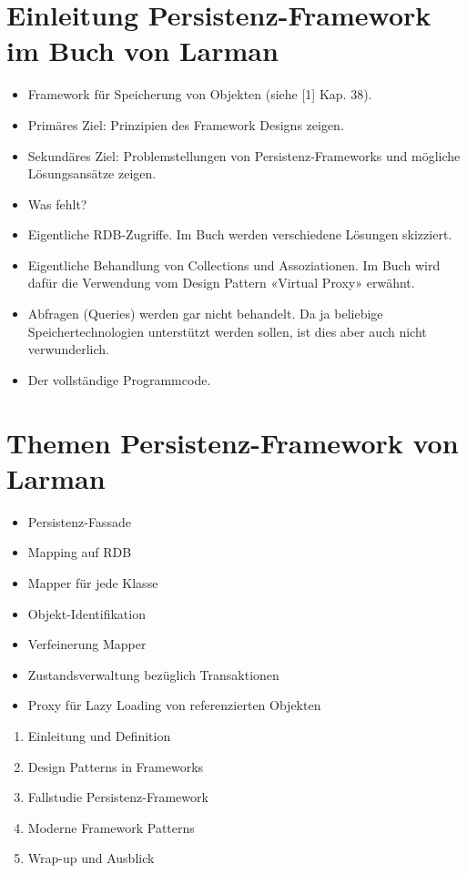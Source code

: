 \section*{Einleitung Persistenz-Framework im Buch von Larman}
\begin{itemize}
  \item Framework für Speicherung von Objekten (siehe [1] Kap. 38).
  \item Primäres Ziel: Prinzipien des Framework Designs zeigen.
  \item Sekundäres Ziel: Problemstellungen von Persistenz-Frameworks und mögliche Lösungsansätze zeigen.
  \item Was fehlt?
  \item Eigentliche RDB-Zugriffe. Im Buch werden verschiedene Lösungen skizziert.
  \item Eigentliche Behandlung von Collections und Assoziationen. Im Buch wird dafür die Verwendung vom Design Pattern «Virtual Proxy» erwähnt.
  \item Abfragen (Queries) werden gar nicht behandelt. Da ja beliebige Speichertechnologien unterstützt werden sollen, ist dies aber auch nicht verwunderlich.
  \item Der vollständige Programmcode.
\end{itemize}

\section*{Themen Persistenz-Framework von Larman}
\begin{itemize}
  \item Persistenz-Fassade
  \item Mapping auf RDB
  \item Mapper für jede Klasse
  \item Objekt-Identifikation
  \item Verfeinerung Mapper
  \item Zustandsverwaltung bezüglich Transaktionen
  \item Proxy für Lazy Loading von referenzierten Objekten
\end{itemize}

\begin{enumerate}
  \item Einleitung und Definition
  \item Design Patterns in Frameworks
  \item Fallstudie Persistenz-Framework
  \item Moderne Framework Patterns
  \item Wrap-up und Ausblick
\end{enumerate}

